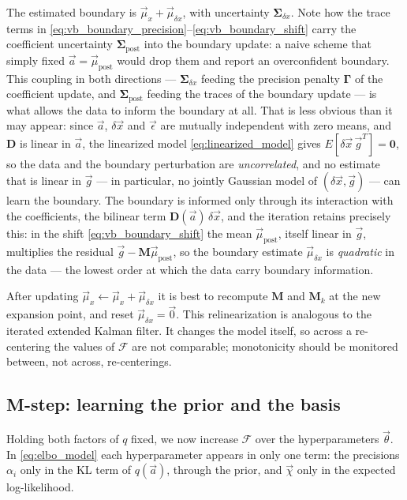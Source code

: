 \documentclass{article}
\begin{document}
The estimated boundary is $\vec\mu_x + \vec\mu_{\delta x}$, with uncertainty $\mathbf{\Sigma}_{\delta x}$. Note how the trace terms in \eqref{eq:vb_boundary_precision}--\eqref{eq:vb_boundary_shift} carry the coefficient uncertainty $\mathbf{\Sigma}_{\text{post}}$ into the boundary update: a naive scheme that simply fixed $\vec a = \vec\mu_{\text{post}}$ would drop them and report an overconfident boundary. This coupling in both directions --- $\mathbf{\Sigma}_{\delta x}$ feeding the precision penalty $\mathbf\Gamma$ of the coefficient update, and $\mathbf{\Sigma}_{\text{post}}$ feeding the traces of the boundary update --- is what allows the data to inform the boundary at all. That is less obvious than it may appear: since $\vec a$, $\delta\vec x$ and $\vec\epsilon$ are mutually independent with zero means, and $\mathbf D$ is linear in $\vec a$, the linearized model \eqref{eq:linearized_model} gives $E[\delta\vec x\,\vec g^T] = \mathbf 0$, so the data and the boundary perturbation are \emph{uncorrelated}, and no estimate that is linear in $\vec g$ --- in particular, no jointly Gaussian model of $(\delta\vec x, \vec g)$ --- can learn the boundary. The boundary is informed only through its interaction with the coefficients, the bilinear term $\mathbf D(\vec a)\,\delta\vec x$, and the iteration retains precisely this: in the shift \eqref{eq:vb_boundary_shift} the mean $\vec\mu_{\text{post}}$, itself linear in $\vec g$, multiplies the residual $\vec g - \mathbf M\vec\mu_{\text{post}}$, so the boundary estimate $\vec\mu_{\delta x}$ is \emph{quadratic} in the data --- the lowest order at which the data carry boundary information.

After updating $\vec\mu_x \leftarrow \vec\mu_x + \vec\mu_{\delta x}$ it is best to recompute $\mathbf M$ and $\mathbf M_k$ at the new expansion point, and reset $\vec\mu_{\delta x} = \vec 0$. This relinearization is analogous to the iterated extended Kalman filter. It changes the model itself, so across a re-centering the values of $\mathcal F$ are not comparable; monotonicity should be monitored between, not across, re-centerings.

\subsection{M-step: learning the prior and the basis} \label{sec:mstep}
Holding both factors of $q$ fixed, we now increase $\mathcal F$ over the hyperparameters $\vec\theta$. In \eqref{eq:elbo_model} each hyperparameter appears in only one term: the precisions $\alpha_i$ only in the KL term of $q(\vec a)$, through the prior, and $\vec\chi$ only in the expected log-likelihood.
\end{document}
